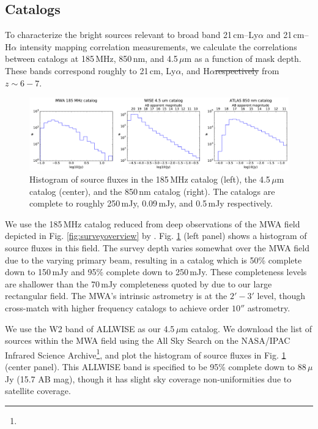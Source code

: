 \documentclass[numberedappendix]{emulateapj}
\providecommand{\DIFadd}[1]{{\protect\color{blue}\uwave{#1}}} %
\providecommand{\DIFdel}[1]{{\protect\color{red}\sout{#1}}}                      %
\providecommand{\DIFaddbegin}{} %
\providecommand{\DIFaddend}{} %
\providecommand{\DIFdelbegin}{} %
\providecommand{\DIFdelend}{} %
\begin{document}
\subsection{Catalogs}
\label{sec:catalogs}

To characterize the bright sources relevant to broad band  21\,cm--Ly$\alpha$ and  21\,cm--H$\alpha$ intensity mapping correlation measurements, we calculate the correlations between catalogs at 185\,MHz, 850\,nm, and 4.5\,$\mu$m as a function of mask depth. These bands correspond roughly to 21\,cm, Ly$\alpha$, and H$\alpha$\DIFdelbegin \DIFdel{respectively }\DIFdelend \DIFaddbegin \DIFadd{, respectively, }\DIFaddend from $z\sim6-7$. 

\begin{figure}[t]
\centering
\includegraphics[width=6.5in]{catalog_histograms.pdf}
\caption[Histogram of source fluxes in the 185\,MHz, 850\,nm, and 4.5\,$\mu$m catalogs.]{Histogram of source fluxes in the 185\,MHz catalog (left), the 4.5\,$\mu$m catalog (center), and the 850\,nm catalog (right). The catalogs are complete to roughly 250\,mJy, 0.09\,mJy, and 0.5\,mJy respectively.}
\label{fig:cataloghistograms}
\end{figure}

We use the 185\,MHz catalog reduced from deep observations of the MWA field depicted in Fig. \ref{fig:surveyoverview} by \citet{PattiCatalog1}. Fig. \ref{fig:cataloghistograms} (left panel) shows a histogram of source fluxes in this field. The survey depth varies somewhat over the MWA field due to the varying primary beam, resulting in a catalog which is 50\% complete down to 150\,mJy and 95\% complete down to 250\,mJy. These completeness levels are shallower than the 70\,mJy completeness quoted by \citet{PattiCatalog1} due to our large rectangular field. The MWA's intrinsic astrometry is at the $2'-3'$ level, though \citep{PattiCatalog1} cross-match with higher frequency catalogs to achieve order $10''$ astrometry. 

We use the W2 band of ALLWISE \citep{Wright2010,allwise} as our 4.5\,$\mu$m catalog. We download the list of sources within the MWA field using the All Sky Search on the NASA/IPAC Infrared Science Archive\footnote{}, and plot the histogram of source fluxes in Fig. \ref{fig:cataloghistograms} (center panel). This ALLWISE band is specified to be 95\% complete down to 88\,$\mu$Jy (15.7 AB mag), though it has slight sky coverage non-uniformities due to satellite coverage.
\end{document}
